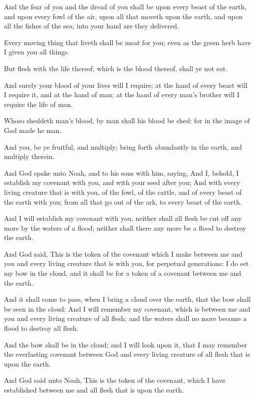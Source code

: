 \verse And the fear of you and the dread of you shall be upon every beast
of the earth, and upon every fowl of the air, upon all that moveth
upon the earth, and upon all the fishes of the sea; into your hand are
they delivered.

\verse Every moving thing that liveth shall be meat for you; even as the
green herb have I given you all things.

\verse But flesh with the life thereof, which is the blood thereof, shall
ye not eat.

\verse And surely your blood of your lives will I require; at the hand of
every beast will I require it, and at the hand of man; at the hand of
every man's brother will I require the life of man.

\verse Whoso sheddeth man's blood, by man shall his blood be shed: for in
the image of God made he man.

\verse And you, be ye fruitful, and multiply; bring forth abundantly in
the earth, and multiply therein.

\verse And God spake unto Noah, and to his sons with him, saying, \verse And
I, behold, I establish my covenant with you, and with your seed after
you; \verse And with every living creature that is with you, of the
fowl, of the cattle, and of every beast of the earth with you; from
all that go out of the ark, to every beast of the earth.

\verse And I will establish my covenant with you, neither shall all
flesh be cut off any more by the waters of a flood; neither shall
there any more be a flood to destroy the earth.

\verse And God said, This is the token of the covenant which I make
between me and you and every living creature that is with you, for
perpetual generations: \verse I do set my bow in the cloud, and it shall
be for a token of a covenant between me and the earth.

\verse And it shall come to pass, when I bring a cloud over the earth,
that the bow shall be seen in the cloud: \verse And I will remember my
covenant, which is between me and you and every living creature of all
flesh; and the waters shall no more become a flood to destroy all
flesh.

\verse And the bow shall be in the cloud; and I will look upon it, that
I may remember the everlasting covenant between God and every living
creature of all flesh that is upon the earth.

\verse And God said unto Noah, This is the token of the covenant, which
I have established between me and all flesh that is upon the earth.

